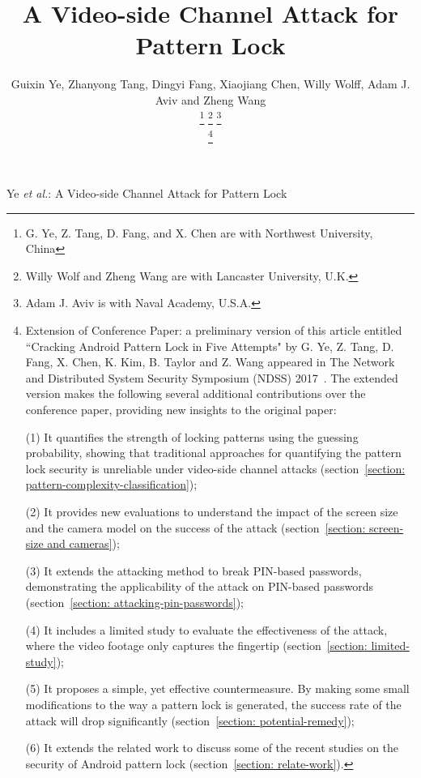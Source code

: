 \documentclass[journal,table,twoside]{IEEEtran}
\begin{document}
\title{A Video-side Channel Attack for Pattern Lock}
\author{Guixin Ye, Zhanyong Tang, Dingyi Fang, Xiaojiang Chen,
        Willy Wolff, Adam J. Aviv and Zheng Wang

    \thanks{G. Ye, Z. Tang, D. Fang, and X. Chen are with Northwest University, China}%
    \thanks{Willy Wolf and Zheng Wang are with Lancaster University, U.K.}
    \thanks{Adam J. Aviv is with Naval Academy, U.S.A.}

    \thanks{
            Extension of Conference Paper: a preliminary version of this article entitled ``Cracking Android Pattern Lock
            in Five Attempts" by G. Ye, Z. Tang, D. Fang, X. Chen, K. Kim, B. Taylor and Z. Wang appeared in
            The Network and Distributed System Security Symposium (NDSS) 2017~\cite{ye2017cracking}.
            The extended version makes the following several additional contributions over the conference
            paper, providing new insights to the original paper:


            (1)	It quantifies the strength of locking patterns using the guessing probability, showing that traditional approaches for quantifying the pattern lock security is unreliable under video-side channel attacks (section~\ref{section: pattern-complexity-classification});


            (2)	It provides new evaluations to understand the impact of the screen size and the camera model on the success of the attack (section~\ref{section: screen-size and cameras});


            (3)	It extends the attacking method to break PIN-based passwords, demonstrating the applicability of the attack on PIN-based passwords (section~\ref{section: attacking-pin-passwords});


            (4)	It includes a limited study to evaluate the effectiveness of the attack, where the video footage only captures the fingertip (section~\ref{section: limited-study});


            (5)	It proposes a simple, yet effective countermeasure. By making some small modifications to the way a pattern lock is generated, the success rate of the attack will drop significantly (section~\ref{section: potential-remedy});


            (6)	It extends the related work to discuss some of the recent studies on the security of Android pattern lock (section~\ref{section: relate-work}).

    }
}

%
{Ye \MakeLowercase{\textit{et al.}}: A Video-side Channel Attack for Pattern Lock}
\end{document}
